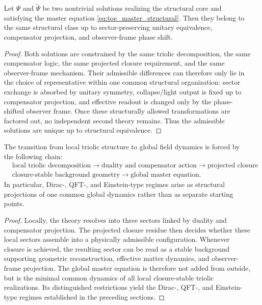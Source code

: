 \begin{theorem}
\label{thm:structural-uniqueness}
Let $\Psi$ and $\widetilde\Psi$ be two nontrivial solutions realizing the
structural core and satisfying the master equation
\eqref{eq:toe_master_structural}. Then they belong to the same structural
class up to sector-preserving unitary equivalence, compensator projection, and
observer-frame phase shift.
\end{theorem}

\begin{proof}
Both solutions are constrained by the same triolic decomposition, the same
compensator logic, the same projected closure requirement, and the same
observer-frame mechanism. Their admissible differences can therefore only lie
in the choice of representative within one common structural organization:
sector exchange is absorbed by unitary symmetry, collapse/light output is fixed
up to compensator projection, and effective readout is changed only by the
phase-shifted observer frame. Once these structurally allowed transformations
are factored out, no independent second theory remains. Thus the admissible
solutions are unique up to structural equivalence.
\end{proof}

\begin{proposition}
\label{prop:local-to-global}
The transition from local triolic structure to global field dynamics is forced
by the following chain:
\[
\begin{aligned}
&\text{local triolic decomposition}
 \longrightarrow \text{duality and compensator action}
 \longrightarrow \text{projected closure}\\
&\text{closure-stable background geometry}
 \longrightarrow \text{global master equation}.
\end{aligned}
\]
In particular, Dirac-, QFT-, and Einstein-type regimes arise as structural
projections of one common global dynamics rather than as separate starting
points.
\end{proposition}

\begin{proof}
Locally, the theory resolves into three sectors linked by duality and
compensator projection. The projected closure residue then decides whether
these local sectors assemble into a physically admissible configuration.
Whenever closure is achieved, the resulting sector can be read as a stable
background supporting geometric reconstruction, effective matter dynamics, and
observer-frame projection. The global master equation is therefore not added
from outside, but is the minimal common dynamics of all local closure-stable
triolic realizations. Its distinguished restrictions yield the Dirac-, QFT-,
and Einstein-type regimes established in the preceding sections.
\end{proof}

